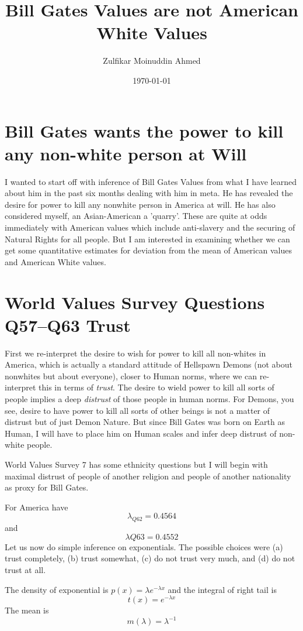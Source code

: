 \documentclass{amsart}
\title{Bill Gates Values are not American White Values}
\author{Zulfikar Moinuddin Ahmed}
\date{\today}
\begin{document}
\maketitle

\section{Bill Gates wants the power to kill any non-white person at Will}

I wanted to start off with inference of Bill Gates Values from what I have learned about him in the past six months dealing with him in meta.  He has revealed the desire for power to kill any nonwhite person in America at will.  He has also considered myself, an Asian-American a 'quarry'.  These are quite at odds immediately with American values which include anti-slavery and the securing of Natural Rights for all people.  But I am interested in examining whether we can get some quantitative estimates for deviation from the mean of American values and American White values.

\section{World Values Survey Questions Q57--Q63 Trust}

First we re-interpret the desire to wish for power to kill all non-whites in America, which is actually a standard attitude of Hellspawn Demons (not about nonwhites but about everyone), closer to Human norms, where we can re-interpret this in terms of {\em trust}.  The desire to wield power to kill all sorts of people implies a deep {\em distrust} of those people in human norms.  For Demons, you see, desire to have power to kill all sorts of other beings is not a matter of distrust but of just Demon Nature.  But since Bill Gates was born on Earth as Human, I will have to place him on Human scales and infer deep distrust of non-white people.

World Values Survey 7 has some ethnicity questions but I will begin with maximal distrust of people of another religion and people of another nationality as proxy for Bill Gates.

For America have 
\[
\lambda_{Q62} = 0.4564
\]
and
\[
\lambda{Q63} = 0.4552
\]
Let us now do simple inference on exponentials.  The possible choices were (a) trust completely, (b) trust somewhat,
(c) do not trust very much, and (d) do not trust at all.

The density of exponential is $p(x) = \lambda e^{-\lambda x}$ and the integral of right tail is 
\[
t(x) = e^{-\lambda x}
\]
The mean is
\[
m(\lambda) = \lambda^{-1}
\]
\end{document}
